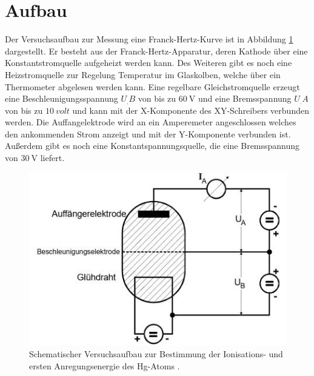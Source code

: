 \section{Aufbau}
\label{sec:Aufbau}
Der Versuchsaufbau zur Messung eine Franck-Hertz-Kurve ist in Abbildung \ref{fig:aufbau} dargestellt.
Er besteht aus der Franck-Hertz-Apparatur, deren Kathode über eine Konstantstromquelle aufgeheizt werden kann.
Des Weiteren gibt es noch eine Heizstromquelle zur Regelung Temperatur im Glaskolben, welche über ein Thermometer abgelesen werden kann. Eine regelbare Gleichstromquelle erzeugt eine Beschleunigungsspannung $U_.B$ von bis zu $\SI{60}{\volt}$ und eine Bremsspannung $U_.A$ von bis zu $\SI{10}{volt}$ und kann mit der X-Komponente des XY-Schreibers verbunden werden. Die Auffangelektrode wird an ein Amperemeter angeschlossen welches den ankommenden Strom anzeigt und mit der Y-Komponente verbunden ist. Außerdem gibt es noch eine Konstantspannungsquelle, die eine Bremsspannung von $\SI{30}{\volt}$ liefert.

\begin{figure}
\centering
\includegraphics[scale=0.7]{content/images/apparatur.jpg}
\caption{Schematischer Versuchsaufbau zur Bestimmung der Ionisations- und ersten Anregungsenergie des Hg-Atoms \cite{V601}.}
\label{fig:aufbau}
\end{figure}
